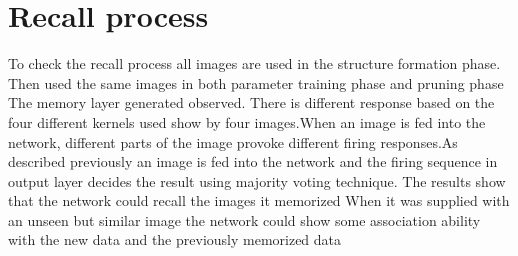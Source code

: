 \section{Recall process}
To check the recall process all images are used in the structure formation
phase. Then used the same images in both parameter training phase and pruning
phase The memory layer generated observed. There is different response based on
the four different kernels used show by four images.When an image is fed into
the network, different parts of the image provoke different firing responses.As
described previously an image is fed into the network and the firing sequence
in output layer decides the result using majority voting technique. The results
show that the network could recall the images it memorized When it was supplied
with an unseen but similar image the network could show some association
ability with the new data and the previously memorized data

